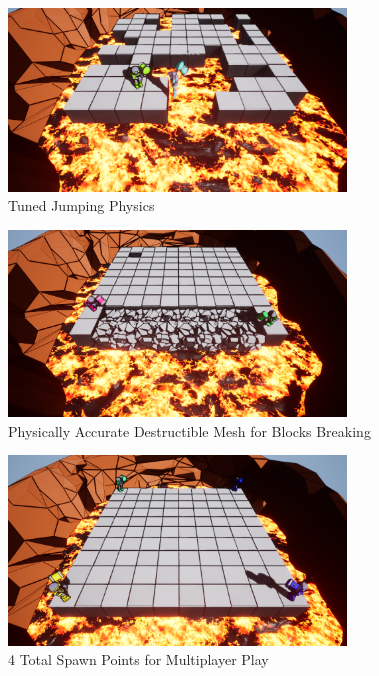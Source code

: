 \documentclass[conference,compsoc]{IEEEtran}
\begin{document}
\begin{figure}[b]
  \centering
  \includegraphics[width=0.8\textwidth]{jumping.png}%
  \caption{Tuned Jumping Physics}
\end{figure}


\begin{figure}[t]
  \centering
  \includegraphics[width=0.8\textwidth]{blocksbreaking.png}%
  \caption{Physically Accurate Destructible Mesh for Blocks Breaking}
\end{figure}
\begin{figure}[b]
  \centering
  \includegraphics[width=0.8\textwidth]{spawns.png}%
  \caption{4 Total Spawn Points for Multiplayer Play}
\end{figure}

\newpage
\end{document}
